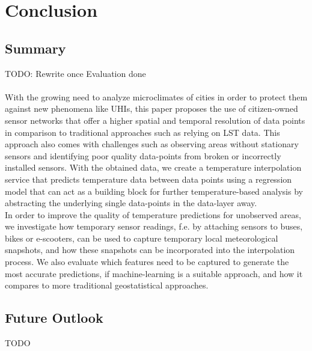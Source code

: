 \chapter{Conclusion}
\label{chap:Conclusion}

\section{Summary}

TODO: Rewrite once Evaluation done\\
\\

With the growing need to analyze microclimates of cities in order to protect them against new phenomena like UHIs, this paper proposes the use of citizen-owned sensor networks that offer a higher spatial and temporal resolution of data points in comparison to traditional approaches such as relying on LST data. This approach also comes with challenges such as observing areas without stationary sensors and identifying poor quality data-points from broken or incorrectly installed sensors. With the obtained data, we create a temperature interpolation service that predicts temperature data between data points using a regression model that can act as a building block for further temperature-based analysis by abstracting the underlying single data-points in the data-layer away.\\
In order to improve the quality of temperature predictions for unobserved areas, we investigate how temporary sensor readings, f.e. by attaching sensors to buses, bikes or e-scooters, can be used to capture temporary local meteorological snapshots, and how these snapshots can be incorporated into the interpolation process. We also evaluate which features need to be captured to generate the most accurate predictions, if machine-learning is a suitable approach, and how it compares to more traditional geostatistical approaches.

\section{Future Outlook}

TODO